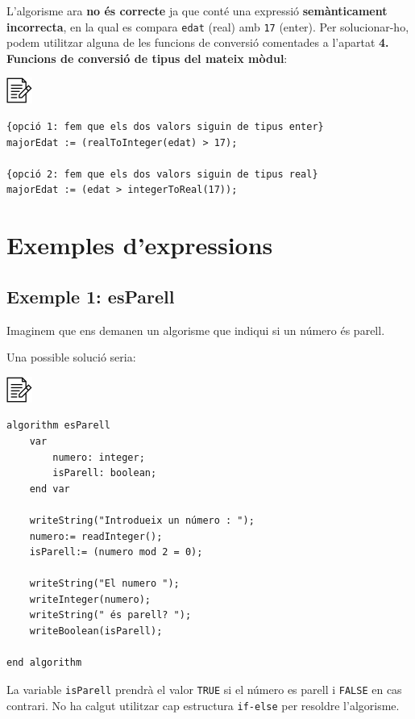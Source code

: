 \documentclass[]{book}
\begin{document}
L'algorisme ara \textbf{no és correcte} ja que conté una expressió
\textbf{semànticament incorrecta}, en la qual es compara \texttt{edat}
(real) amb \texttt{17} (enter). Per solucionar-ho, podem utilitzar
alguna de les funcions de conversió comentades a l'apartat \textbf{4.
Funcions de conversió de tipus del mateix mòdul}:

\includegraphics{./img/alg.png}

\begin{verbatim}
{opció 1: fem que els dos valors siguin de tipus enter}
majorEdat := (realToInteger(edat) > 17);    

{opció 2: fem que els dos valors siguin de tipus real}
majorEdat := (edat > integerToReal(17));
\end{verbatim}

\section{Exemples d'expressions}\label{exemples-dexpressions}

\subsection{Exemple 1: esParell}\label{exemple-1-esparell}

Imaginem que ens demanen un algorisme que indiqui si un número és
parell.

Una possible solució seria:

\includegraphics{./img/alg.png}

\begin{verbatim}
algorithm esParell
    var
        numero: integer;
        isParell: boolean;
    end var

    writeString("Introdueix un número : ");
    numero:= readInteger();
    isParell:= (numero mod 2 = 0);
    
    writeString("El numero ");
    writeInteger(numero);
    writeString(" és parell? ");
    writeBoolean(isParell);

end algorithm
\end{verbatim}

La variable \texttt{isParell} prendrà el valor \texttt{TRUE} si el
número es parell i \texttt{FALSE} en cas contrari. No ha calgut
utilitzar cap estructura \texttt{if-else} per resoldre l'algorisme.
\end{document}
